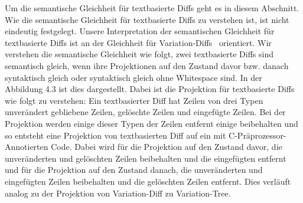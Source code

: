 Um die semantische Gleichheit für textbasierte Diffs geht es in diesem Abschnitt. Wie die semantische Gleichheit für textbasierte Diffs zu verstehen ist, ist nicht eindeutig festgelegt. Unsere Interpretation der semantischen Gleichheit für textbasierte Diffs ist an der Gleichheit für Variation-Diffs~\cite{BSG+:SPLC23} orientiert. Wir verstehen die semantische Gleichheit wie folgt, zwei textbasierte Diffs sind semantisch gleich, wenn ihre Projektionen auf den Zustand davor bzw. danach syntaktisch gleich oder syntaktisch gleich ohne Whitespace sind. In der Abbildung 4.3 ist dies dargestellt. Dabei ist die Projektion für textbasierte Diffs wie folgt zu verstehen: Ein textbasierter Diff hat Zeilen von drei Typen unverändert gebliebene Zeilen, gelöschte Zeilen und eingefügte Zeilen. Bei der Projektion werden einige dieser Typen der Zeilen entfernt einige beibehalten und so entsteht eine Projektion von textbasierten Diff auf ein mit C-Präprozessor-Annotierten Code. Dabei wird für die Projektion auf den Zustand davor, die unveränderten und gelöschten Zeilen beibehalten und die eingefügten entfernt und für die Projektion auf den Zustand danach, die unveränderten und eingefügten Zeilen beibehalten und die gelöschten Zeilen entfernt. Dies verläuft analog zu der Projektion von Variation-Diff zu Variation-Tree.


